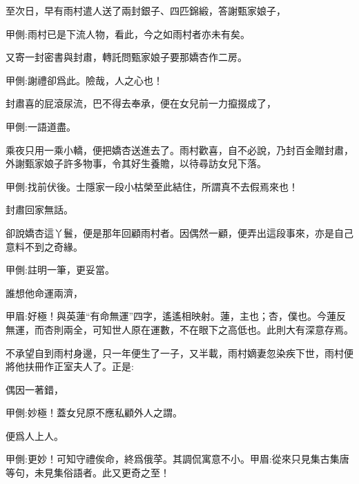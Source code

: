 \begin{parag}
    至次日，早有雨村遣人送了兩封銀子、四匹錦緞，答謝甄家娘子，\begin{note}甲側:雨村已是下流人物，看此，今之如雨村者亦未有矣。\end{note}又寄一封密書與封肅，轉託問甄家娘子要那嬌杏作二房。\begin{note}甲側:謝禮卻爲此。險哉，人之心也！\end{note}封肅喜的屁滾尿流，巴不得去奉承，便在女兒前一力攛掇成了，\begin{note}甲側:一語道盡。\end{note}乘夜只用一乘小轎，便把嬌杏送進去了。雨村歡喜，自不必說，乃封百金贈封肅，外謝甄家娘子許多物事，令其好生養贍，以待尋訪女兒下落。\begin{note}甲側:找前伏後。士隱家一段小枯榮至此結住，所謂真不去假焉來也！\end{note}封肅回家無話。
\end{parag}


\begin{parag}
    卻說嬌杏這丫鬟，便是那年回顧雨村者。因偶然一顧，便弄出這段事來，亦是自己意料不到之奇緣。\begin{note}甲側:註明一筆，更妥當。\end{note}誰想他命運兩濟，\begin{note}甲眉:好極！與英蓮“有命無運”四字，遙遙相映射。蓮，主也；杏，僕也。今蓮反無運，而杏則兩全，可知世人原在運數，不在眼下之高低也。此則大有深意存焉。\end{note}不承望自到雨村身邊，只一年便生了一子，又半載，雨村嫡妻忽染疾下世，雨村便將他扶冊作正室夫人了。正是:
\end{parag}


\begin{poem}
    \begin{pl}偶因一著錯，\end{pl}\begin{note}甲側:妙極！蓋女兒原不應私顧外人之謂。\end{note}

    \begin{pl}便爲人上人。\end{pl}\begin{note}甲側:更妙！可知守禮俟命，終爲俄莩。其調侃寓意不小。甲眉:從來只見集古集唐等句，未見集俗語者。此又更奇之至！\end{note}

\end{poem}


